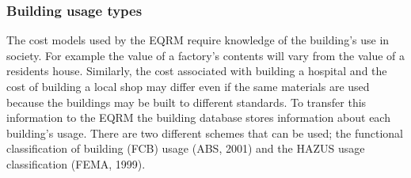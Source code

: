 \subsubsection{Building usage types}
\label{sec:grids-usageclass}

The cost models used by the EQRM require knowledge of the
building's use in society. For example the value of a factory's
contents will vary from the value of a residents house. Similarly,
the cost associated with building a hospital and the cost of
building a local shop may differ even if the same materials are
used because the buildings may be built to different standards. To
transfer this information to the EQRM the building
database  stores information about
each building's usage. There are two different schemes that can be
used; the functional classification of building (FCB)
usage (ABS, 2001) %
 and the HAZUS usage classification
(FEMA, 1999). %


